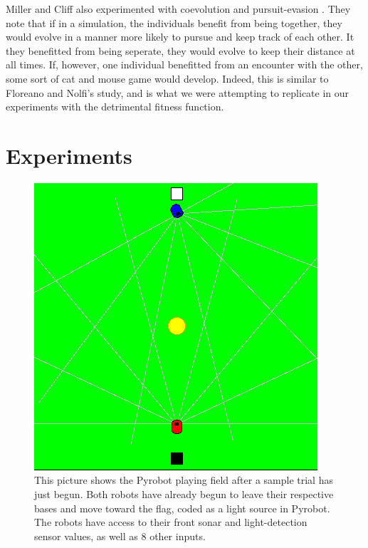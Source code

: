 \documentclass[11pt]{article}
\begin{document}
Miller and Cliff also experimented with coevolution and pursuit-evasion \cite{pursuit}. They note that if in a simulation, the individuals benefit from being together, they would evolve in a manner more likely to pursue and keep track of each other.  It they benefitted from being seperate, they would evolve to keep their distance at all times.  If, however, one individual benefitted from an encounter with the other, some sort of cat and mouse game would develop. Indeed, this is similar to Floreano and Nolfi's study, and is what we were attempting to replicate in our experiments with the detrimental fitness function.

\section{Experiments}

\begin{figure}[h]
\begin{center}
\includegraphics[scale=0.5]{Screenshot_-_030714_-_00_15_04.png}
\end{center}
\caption{This picture shows the Pyrobot playing field after a sample trial has just begun. Both robots have already begun to leave their respective bases and move toward the flag, coded as a light source in Pyrobot. The robots have access to their front sonar and light-detection sensor values, as well as 8 other inputs.}
\label{setup}
\end{figure}
\end{document}
